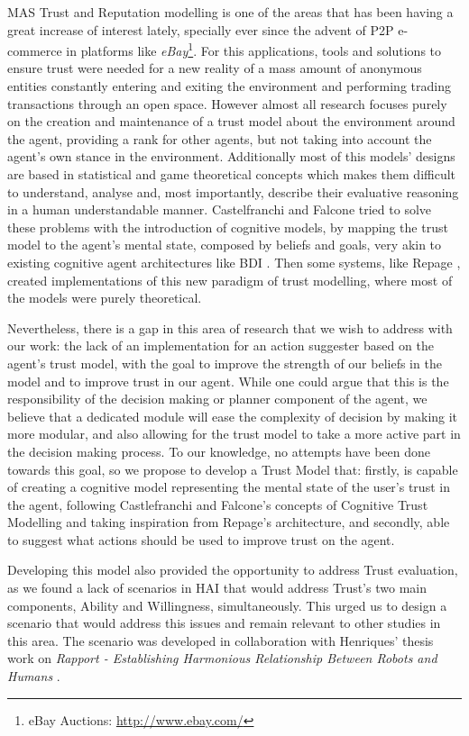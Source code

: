 \ac{MAS} Trust and Reputation modelling is one of the areas that has been having a great increase of interest lately, specially ever since the advent of \ac{P2P} e-commerce in platforms like \textit{eBay}\footnote{eBay Auctions: \url{http://www.ebay.com/}}. For this applications, tools and solutions to ensure trust were needed for a new reality of a mass amount of anonymous entities constantly entering and exiting the environment and performing trading transactions through an open space. However almost all research focuses purely on the creation and maintenance of a trust model about the environment around the agent, providing a rank for other agents, but not taking into account the agent's own stance in the environment. Additionally most of this models' designs are based in statistical and game theoretical concepts \cite{Granatyr2015} which makes them difficult to understand, analyse and, most importantly, describe their evaluative reasoning in a human understandable manner.
Castelfranchi and Falcone \cite{Castelfranchi1998} tried to solve these problems with the introduction of cognitive models, by mapping the trust model to the agent's mental state, composed by beliefs and goals, very akin to existing cognitive agent architectures like \ac{BDI} \cite{Rao1995}. Then some systems, like Repage \cite{Sabater2006}, created implementations of this new paradigm of trust modelling, where most of the models were purely theoretical.

Nevertheless, there is a gap in this area of research that we wish to address with our work: the lack of an implementation for an action suggester based on the agent's trust model, with the goal to improve the strength of our beliefs in the model and to improve trust in our agent. While one could argue that this is the responsibility of the decision making or planner component of the agent, we believe that a dedicated module will ease the complexity of decision by making it more modular, and also allowing for the trust model to take a more active part in the decision making process. To our knowledge, no attempts have been done towards this goal, so we propose to develop a Trust Model that: firstly, is capable of creating a cognitive model representing the mental state of the user's trust in the agent, following Castlefranchi and Falcone's concepts of Cognitive Trust Modelling and taking inspiration from Repage's architecture, and secondly, able to suggest what actions should be used to improve trust on the agent.

Developing this model also provided the opportunity to address Trust evaluation, as we found  a lack of scenarios in \ac{HAI} that would address Trust's two main components, Ability and Willingness, simultaneously. This urged us to design a scenario that would address this issues and remain relevant to other studies in this area. The scenario was developed in collaboration with Henriques' thesis work on \textit{Rapport - Establishing Harmonious Relationship Between Robots and Humans} \cite{Henriques2016}.




